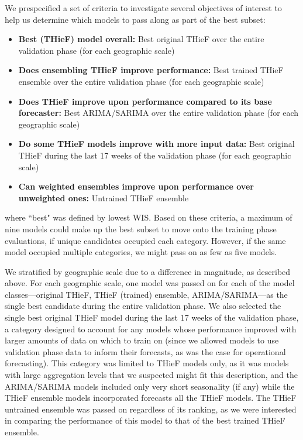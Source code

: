 \documentclass[thesis]{umassthesis}  %
\begin{document}
We prespecified a set of criteria to investigate several objectives of interest to help us determine which models to pass along as part of the best subset:
\begin{itemize}
\item \textbf{Best (THieF) model overall:} \newline Best original THieF over the entire validation phase (for each geographic scale)
\item \textbf{Does ensembling THieF improve performance:} \newline Best trained THieF ensemble over the entire validation phase (for each geographic scale)
\item \textbf{Does THieF improve upon performance compared to its base forecaster:} \newline Best ARIMA/SARIMA over the entire validation phase (for each geographic scale)
\item \textbf{Do some THieF models improve with more input data:} Best original THieF during the last 17 weeks of the validation phase (for each geographic scale)
\item \textbf{Can weighted ensembles improve upon performance over unweighted ones:} \newline Untrained THieF ensemble
\end{itemize}
where ``best" was defined by lowest WIS. Based on these criteria, a maximum of nine models could make up the best subset to move onto the training phase evaluations, if unique candidates occupied each category. However, if the same model occupied multiple categories, we might pass on as few as five models.

We stratified by geographic scale due to a difference in magnitude, as described above. For each geographic scale, one model was passed on for each of the model classes---original THieF, THieF (trained) ensemble, ARIMA/SARIMA---as the single best candidate during the entire validation phase. We also selected the single best original THieF model during the last 17 weeks of the validation phase, a category designed to account for any models whose performance improved with larger amounts of data on which to train on (since we allowed models to use validation phase data to inform their forecasts, as was the case for operational forecasting). This category was limited to THieF models only, as it was models with large aggregation levels that we suspected might fit this description, and the ARIMA/SARIMA models included only very short seasonality (if any) while the THieF ensemble models incorporated forecasts all the THieF models. The THieF untrained ensemble was passed on regardless of its ranking, as we were interested in comparing the performance of this model to that of the best trained THieF ensemble.
\end{document}
